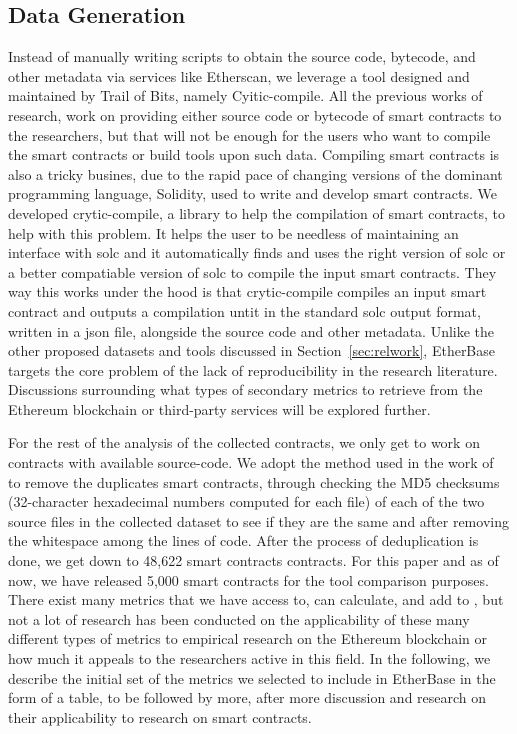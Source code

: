 	\subsection{Data Generation}
		Instead of manually writing scripts to obtain the source code, bytecode, and other metadata via services like Etherscan, we leverage a tool designed and maintained by Trail of Bits, namely Cyitic-compile.
		All the previous works of research, work on providing either source code or bytecode of smart contracts to the researchers, but that will not be enough for the users who want to compile the smart contracts or build tools upon such data.
		Compiling smart contracts is also a tricky busines, due to the rapid pace of changing versions of the dominant programming language, Solidity, used to write and develop smart contracts.
		We developed crytic-compile, a library to help the compilation of smart contracts, to help with this problem.
		It helps the user to be needless of maintaining an interface with solc and it automatically finds and uses the right version of solc or a better compatiable version of solc to compile the input smart contracts.
		They way this works under the hood is that crytic-compile compiles an input smart contract and outputs a compilation untit in the standard solc output format, written in a json file, alongside the source code and other metadata.
		Unlike the other proposed datasets and tools discussed in Section~\ref{sec:relwork}, EtherBase targets the core problem of the lack of reproducibility in the research literature.
		Discussions surrounding what types of secondary metrics to retrieve from the Ethereum blockchain or third-party services will be explored further.
		
		For the rest of the analysis of the collected contracts, we only get to work on contracts with available source-code.
		We adopt the method used in the work of ~\cite{deduplicate} to remove the duplicates smart contracts,
		through checking the MD5 checksums (32-character hexadecimal numbers computed for each file) of each of the two source files in the collected dataset to see if they are the same and after removing the whitespace among the lines of code.
		After the process of deduplication is done, we get down to 48,622 smart contracts contracts.
		For this paper and as of now, we have released 5,000 smart contracts for the tool comparison purposes.
		There exist many metrics that we have access to, can calculate, and add to \etherbase, but not a lot of research has been conducted on the applicability
		of these many different types of metrics to empirical research on the Ethereum blockchain or how much it appeals to the researchers active in this field.
		In the following, we describe the initial set of the metrics we selected to include in EtherBase in the form of a table, to be followed by more,
		after more discussion and research on their applicability to research on smart contracts.

